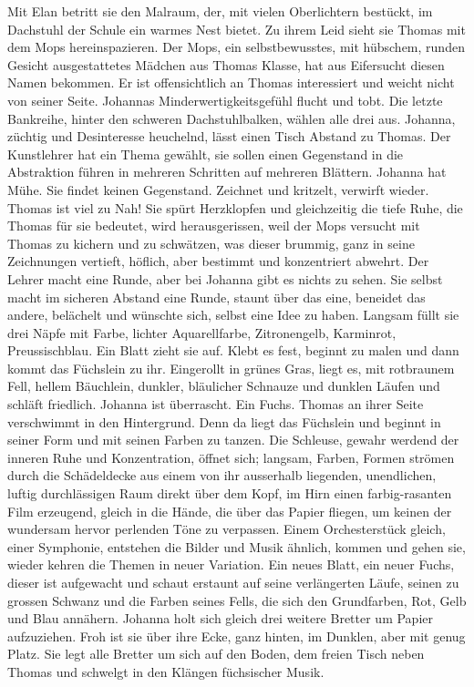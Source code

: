 Mit Elan betritt sie den Malraum, der, mit vielen Oberlichtern bestückt, im Dachstuhl der Schule ein warmes Nest bietet. Zu ihrem Leid sieht sie Thomas mit dem Mops hereinspazieren. Der Mops, ein selbstbewusstes, mit hübschem, runden Gesicht ausgestattetes Mädchen aus Thomas Klasse, hat aus Eifersucht diesen Namen bekommen. Er ist offensichtlich an Thomas interessiert und weicht nicht von seiner Seite. Johannas Minderwertigkeitsgefühl flucht und tobt.
Die letzte Bankreihe, hinter den schweren Dachstuhlbalken, wählen alle drei aus. Johanna, züchtig und Desinteresse heuchelnd, lässt einen Tisch Abstand zu Thomas. Der Kunstlehrer hat ein Thema gewählt, sie sollen einen Gegenstand in die Abstraktion führen in mehreren Schritten auf mehreren Blättern.
Johanna hat Mühe. Sie findet keinen Gegenstand. Zeichnet und kritzelt, verwirft wieder. Thomas ist viel zu Nah! Sie spürt Herzklopfen und gleichzeitig die tiefe Ruhe, die Thomas für sie bedeutet, wird herausgerissen, weil der Mops versucht mit Thomas zu kichern und zu schwätzen, was dieser brummig, ganz in seine Zeichnungen vertieft, höflich, aber bestimmt und konzentriert abwehrt. Der Lehrer macht eine Runde, aber bei Johanna gibt es nichts zu sehen. Sie selbst macht im sicheren Abstand eine Runde, staunt über das eine, beneidet das andere, belächelt und wünschte sich, selbst eine Idee zu haben.
Langsam füllt sie drei  Näpfe mit Farbe, lichter Aquarellfarbe, Zitronengelb, Karminrot, Preussischblau. Ein Blatt zieht sie auf. Klebt es fest, beginnt zu malen und dann kommt das Füchslein zu ihr. Eingerollt in grünes Gras, liegt es, mit rotbraunem Fell, hellem Bäuchlein, dunkler, bläulicher Schnauze und dunklen Läufen und schläft friedlich. Johanna ist überrascht. Ein Fuchs. Thomas an ihrer Seite verschwimmt in den Hintergrund. Denn da liegt das Füchslein und beginnt in seiner  Form und mit seinen Farben zu tanzen.
Die Schleuse, gewahr werdend der inneren Ruhe und Konzentration, öffnet sich; langsam, Farben, Formen strömen durch die Schädeldecke aus einem von ihr ausserhalb liegenden, unendlichen, luftig durchlässigen Raum direkt über dem Kopf, im Hirn einen farbig-rasanten Film erzeugend, gleich in die Hände, die über das Papier fliegen, um keinen der wundersam hervor perlenden Töne zu verpassen. Einem Orchesterstück gleich, einer Symphonie, entstehen die Bilder und Musik ähnlich, kommen und gehen sie, wieder kehren die Themen in neuer Variation.
Ein neues Blatt, ein neuer Fuchs, dieser ist aufgewacht und schaut erstaunt auf seine verlängerten Läufe, seinen zu grossen Schwanz und die Farben seines Fells, die sich den Grundfarben, Rot, Gelb und Blau annähern. Johanna holt sich gleich drei weitere Bretter um Papier aufzuziehen. Froh ist sie über ihre Ecke, ganz hinten, im Dunklen, aber mit genug Platz. Sie legt alle Bretter um sich auf den Boden, dem freien Tisch neben Thomas und schwelgt in den Klängen füchsischer Musik.
